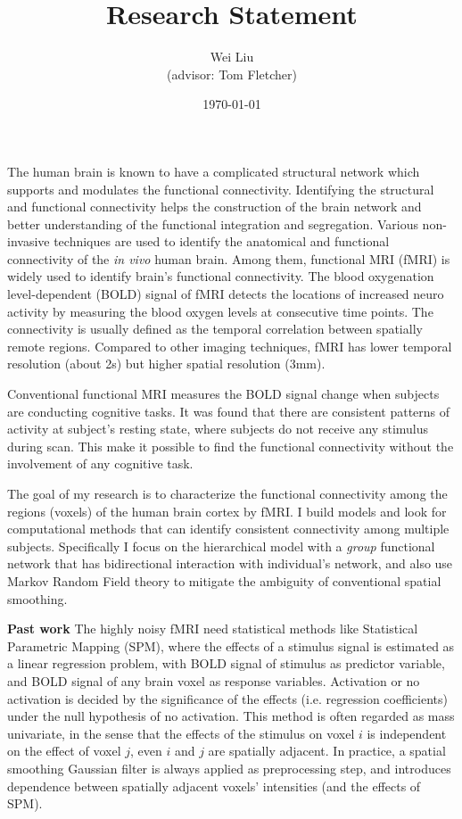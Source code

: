 \documentclass[]{article}
\begin{document}
\title{Research Statement} 
\author{Wei Liu\\ \small{(advisor: Tom Fletcher)} }
\date{\today} 
\maketitle 

The human brain is known to have a complicated structural network which supports
and modulates the functional connectivity. Identifying the structural and
functional connectivity helps the construction of the brain network and better
understanding of the functional integration and segregation. Various
non-invasive techniques are used to identify the anatomical and functional
connectivity of the \emph{in vivo} human brain. Among them, functional MRI
(fMRI) is widely used to identify brain's functional connectivity. The blood
oxygenation level-dependent (BOLD) signal of fMRI detects the locations of
increased neuro activity by measuring the blood oxygen levels at consecutive
time points. The connectivity is usually defined as the temporal correlation
between spatially remote regions. Compared to other imaging techniques, fMRI has
lower temporal resolution (about 2s) but higher spatial resolution (3mm).

Conventional functional MRI measures the BOLD signal change when subjects are
conducting cognitive tasks. It was found \cite{raichle2001} that there are
consistent patterns of activity at subject's resting state, where subjects
do not receive any stimulus during scan. This make it possible to find the
functional connectivity without the involvement of  any cognitive task.

The goal of my research is to characterize the functional connectivity among the
regions (voxels) of the human brain cortex by fMRI. I build models and look for
computational methods that can identify consistent connectivity among multiple
subjects. Specifically I focus on the hierarchical model with a \emph{group}
functional network that has bidirectional interaction with individual's network,
and also use Markov Random Field theory to mitigate the ambiguity of
conventional spatial smoothing.

\textbf{Past work} The highly noisy fMRI need statistical methods like
Statistical Parametric Mapping (SPM), where the effects of a stimulus signal is
estimated as a linear regression problem, with BOLD signal of stimulus as
predictor variable, and BOLD signal of any brain voxel as response
variables. Activation or no activation is decided by the significance of the
effects (i.e. regression coefficients) under the null hypothesis of no
activation. This method is often regarded as mass univariate, in the sense that
the effects of the stimulus on voxel $i$ is independent on the effect of voxel
$j$, even $i$ and $j$ are spatially adjacent. In practice, a spatial smoothing
Gaussian filter is always applied as preprocessing step, and introduces
dependence between spatially adjacent voxels' intensities (and the effects of
SPM).
\end{document}

